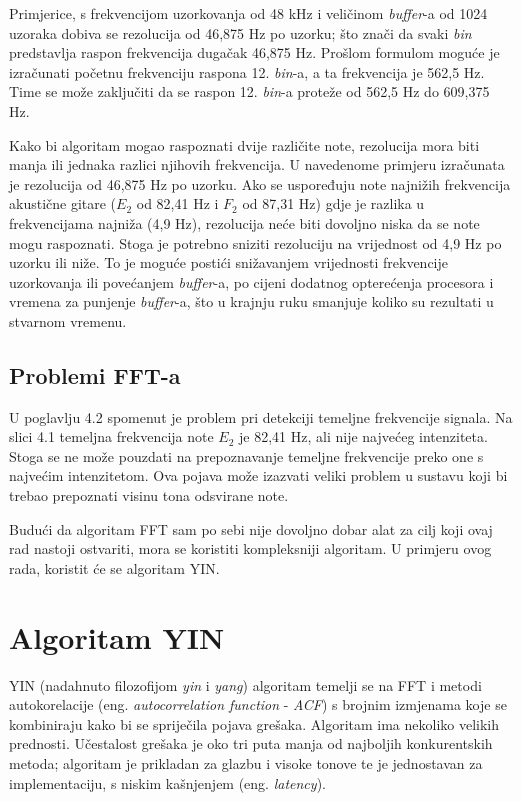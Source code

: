 \documentclass[times, utf8, zavrsni, numeric]{fer}
\begin{document}
Primjerice, s frekvencijom uzorkovanja od 48 kHz i veličinom \textit{buffer}-a od 1024 uzoraka dobiva se rezolucija od 46,875 Hz po uzorku; što znači da svaki \textit{bin} predstavlja raspon frekvencija dugačak 46,875 Hz. Prošlom formulom moguće je izračunati početnu frekvenciju raspona 12. \textit{bin}-a, a ta frekvencija je 562,5 Hz. Time se može zaključiti da se raspon 12. \textit{bin}-a proteže od 562,5 Hz do 609,375 Hz.

Kako bi algoritam mogao raspoznati dvije različite note, rezolucija mora biti manja ili jednaka razlici njihovih frekvencija.
U navedenome primjeru izračunata je rezolucija od 46,875 Hz po uzorku. Ako se uspoređuju note najnižih frekvencija akustične gitare ($E_2$ od 82,41 Hz i $F_2$ od 87,31 Hz) gdje je razlika u frekvencijama najniža (4,9 Hz), rezolucija neće biti dovoljno niska da se note mogu raspoznati. Stoga je potrebno sniziti rezoluciju na vrijednost od 4,9 Hz po uzorku ili niže. To je moguće postići snižavanjem vrijednosti frekvencije uzorkovanja ili povećanjem \textit{buffer}-a, po cijeni dodatnog opterećenja procesora i vremena za punjenje \textit{buffer}-a, što u krajnju ruku smanjuje koliko su rezultati u stvarnom vremenu.

\section{Problemi FFT-a}
U poglavlju 4.2 spomenut je problem pri detekciji temeljne frekvencije signala. Na slici 4.1 temeljna frekvencija note $E_2$ je 82,41 Hz, ali nije najvećeg intenziteta. Stoga se ne može pouzdati na prepoznavanje temeljne frekvencije preko one s najvećim intenzitetom. Ova pojava može izazvati veliki problem u sustavu koji bi trebao prepoznati visinu tona odsvirane note.

Budući da algoritam FFT sam po sebi nije dovoljno dobar alat za cilj koji ovaj rad nastoji ostvariti, mora se koristiti kompleksniji algoritam. U primjeru ovog rada, koristit će se algoritam YIN.

\chapter{Algoritam YIN}
YIN (nadahnuto filozofijom \textit{yin} i \textit{yang}) algoritam temelji se na FFT i metodi autokorelacije (eng. \textit{autocorrelation function} - \textit{ACF}) s brojnim izmjenama koje se kombiniraju kako bi se spriječila pojava grešaka. Algoritam ima nekoliko velikih prednosti. Učestalost grešaka je oko tri puta manja od najboljih konkurentskih metoda; algoritam je prikladan za glazbu i visoke tonove te je jednostavan za implementaciju, s niskim kašnjenjem (eng. \textit{latency}).\cite{de2002yin}
\end{document}
